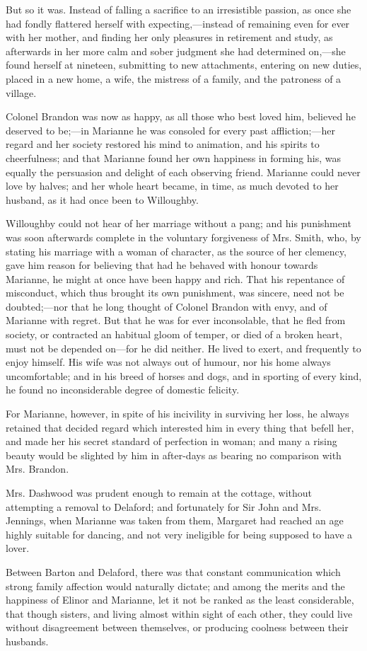 But so it was. Instead of falling a sacrifice to an irresistible passion, as once she had fondly flattered herself with expecting,---instead of remaining even for ever with her mother, and finding her only pleasures in retirement and study, as afterwards in her more calm and sober judgment she had determined on,---she found herself at nineteen, submitting to new attachments, entering on new duties, placed in a new home, a wife, the mistress of a family, and the patroness of a village.

Colonel Brandon was now as happy, as all those who best loved him, believed he deserved to be;---in Marianne he was consoled for every past affliction;---her regard and her society restored his mind to animation, and his spirits to cheerfulness; and that Marianne found her own happiness in forming his, was equally the persuasion and delight of each observing friend. Marianne could never love by halves; and her whole heart became, in time, as much devoted to her husband, as it had once been to Willoughby.

Willoughby could not hear of her marriage without a pang; and his punishment was soon afterwards complete in the voluntary forgiveness of Mrs. Smith, who, by stating his marriage with a woman of character, as the source of her clemency, gave him reason for believing that had he behaved with honour towards Marianne, he might at once have been happy and rich. That his repentance of misconduct, which thus brought its own punishment, was sincere, need not be doubted;---nor that he long thought of Colonel Brandon with envy, and of Marianne with regret. But that he was for ever inconsolable, that he fled from society, or contracted an habitual gloom of temper, or died of a broken heart, must not be depended on---for he did neither. He lived to exert, and frequently to enjoy himself. His wife was not always out of humour, nor his home always uncomfortable; and in his breed of horses and dogs, and in sporting of every kind, he found no inconsiderable degree of domestic felicity.

For Marianne, however, in spite of his incivility in surviving her loss, he always retained that decided regard which interested him in every thing that befell her, and made her his secret standard of perfection in woman; and many a rising beauty would be slighted by him in after-days as bearing no comparison with Mrs. Brandon.

Mrs. Dashwood was prudent enough to remain at the cottage, without attempting a removal to Delaford; and fortunately for Sir John and Mrs. Jennings, when Marianne was taken from them, Margaret had reached an age highly suitable for dancing, and not very ineligible for being supposed to have a lover.

Between Barton and Delaford, there was that constant communication which strong family affection would naturally dictate; and among the merits and the happiness of Elinor and Marianne, let it not be ranked as the least considerable, that though sisters, and living almost within sight of each other, they could live without disagreement between themselves, or producing coolness between their husbands.


